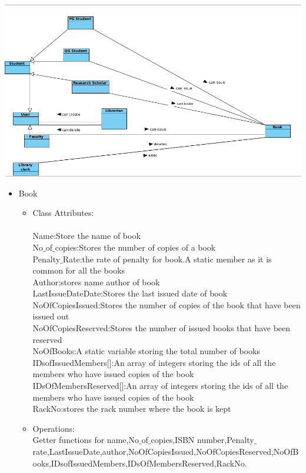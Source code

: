 \documentclass{article}
\begin{document}
\includegraphics[scale=0.50]{images/classDiagSRS.png}
\begin{itemize}

\item Book
\begin{itemize}
\item Class Attributes:\\
\\Name:Store the name of book
\\No$\_$of$\_$copies:Stores the number of copies of a book
\\Penalty$\_$Rate:the rate of penalty for book.A static member as it is common for all the books
\\Author:stores name  author of book 
\\LastIssueDateDate:Stores the last issued date of book
\\NoOfCopiesIssued:Stores the number of copies of the book that have been issued out
\\NoOfCopiesReserved:Stores the number of issued books that have been reserved
\\NoOfBooks:A static variable storing the total number of books
\\IDsofIssuedMembers[]:An array of integers storing the ids of all the members who have issued copies of the book
\\IDsOfMembersReserved[]:An array of integers storing the ids of all the members who have issued copies of the book
\\RackNo:stores the rack number where the book is kept

\item Operations:
\\Getter functions for name,No$\_$of$\_$copies,ISBN number,Penalty$\_$rate,LastIssueDate,author,NoOfCopiesIssued,NoOfCopiesReserved,NoOfBooks,IDsofIssuedMembers,IDsOfMembersReserved,RackNo.


\end{itemize}
\end{itemize}
\end{document}
